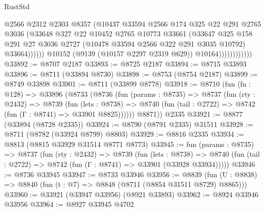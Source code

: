 \begin{lexlean}{RustStd}
\begin{coremodule}
                                  @2566
                                  @2312
                                  @2303
                                  @8357
                                  (@10437
                                    @33594
                                    @2566
                                    @174
                                    @325
                                    @22
                                    @291
                                    @2765
                                    @3036
                                    (@33648
                                      @327
                                      @22
                                      @10452
                                      @2765
                                      @10773
                                      @33661
                                      (@33647
                                        @325
                                        @158
                                        @291
                                        @27
                                        @3036
                                        @2727
                                        (@10478 @33594 @2566 @322 @291 @3035 @10792)
                                        @33664))))))
                            @10152
                            (@9139 (@10157 @2297 @2319 @629))
                            @10164))))))))))))
@33892 := @8707 @2187
@33893 := @8725 @2187
@33894 := @8715 @33893
@33896 := @8711 (@33894 @8730)
@33898 := @8753 (@8754 @2187)
@33899 := @8749 @33898
@33901 := @8711 (@33899 @8778)
@33918 := @8710
    (fun (fn : @128) =>
    @33896
      (@8733
        (@8736
          (fun (params : @8735) =>
          @8737
            (fun (rty : @2432) =>
            @8739
              (fun (lets : @8738) =>
              @8740 (fun (tail : @2722) => @8742 (fun (Γ : @8741) => @33901 @8825))))))
        @8871))
    @2335
@33921 := @8877 (@33894 (@8728 @2335))
@33924 := @8790 (@8791 @2335) @31511
@33928 := @8711 (@8782 (@33924 @8799) @8803)
@33929 := @8816 @2335
@33934 := @8813 (@8815 @33929 @31514 @8771 @8773)
@33945 := fun (params : @8735) =>
  @8737
    (fun (rty : @2432) =>
    @8739
      (fun (lets : @8738) =>
      @8740 (fun (tail : @2722) => @8742 (fun (Γ : @8741) => @33901 (@33928 @33934)))))
@33946 := @8736 @33945
@33947 := @8733 @33946
@33956 := @8839
    (fun (U : @8838) => @8840 (fun (t : @7) => @8848 (@8711 (@8854 @31511 @8729) @8865)))
@33960 := @33921 (@33947 @33956) (@8921 @33893)
@33962 := @8924 @33946 @33956
@33964 := @8927 @33945 @4702

\end{coremodule}
\end{lexlean}
